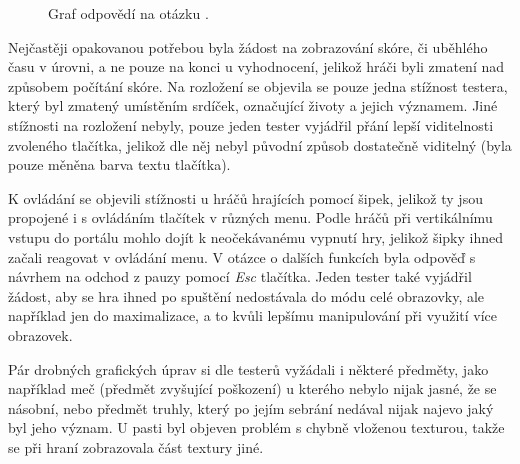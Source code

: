 \begin{figure}[hb]
\centering
\caption{Graf odpovědí na otázku .}
\label{fig:hodnoceni_ui}
\end{figure}

Nejčastěji opakovanou potřebou byla žádost na zobrazování skóre, či uběhlého času v úrovni, a ne pouze na konci u vyhodnocení, jelikož hráči byli zmatení nad způsobem počítání skóre. Na rozložení se objevila se pouze jedna stížnost testera, který byl zmatený umístěním srdíček, označující životy a jejich významem. Jiné stížnosti na rozložení nebyly, pouze jeden tester vyjádřil přání lepší viditelnosti zvoleného tlačítka, jelikož dle něj nebyl původní způsob dostatečně viditelný (byla pouze měněna barva textu tlačítka).

K ovládání se objevili stížnosti u hráčů hrajících pomocí šipek, jelikož ty jsou propojené i s ovládáním tlačítek v různých menu. Podle hráčů při vertikálnímu vstupu do portálu mohlo dojít k neočekávanému vypnutí hry, jelikož šipky ihned začali reagovat v ovládání menu. V otázce o dalších funkcích byla odpověď s návrhem na odchod z pauzy pomocí \textit{Esc} tlačítka. Jeden tester také vyjádřil žádost, aby se hra ihned po spuštění nedostávala do módu celé obrazovky, ale například jen do maximalizace, a to kvůli lepšímu manipulování při využití více obrazovek.

Pár drobných grafických úprav si dle testerů vyžádali i některé předměty, jako například meč (předmět zvyšující poškození) u kterého nebylo nijak jasné, že se násobní, nebo předmět truhly, který po jejím sebrání nedával nijak najevo jaký byl jeho význam. U pasti byl objeven problém s chybně vloženou texturou, takže se při hraní zobrazovala část textury jiné.


